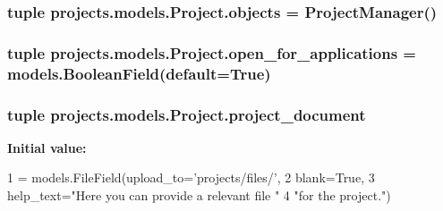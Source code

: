 \hypertarget{classprojects_1_1models_1_1_project_a22a79d939594eb73e56095e8cfb2d314}{
\subsubsection[{objects}]{\setlength{\rightskip}{0pt plus 5cm}tuple projects.\-models.\-Project.\-objects = {\bf Project\-Manager}()\hspace{0.3cm}{\ttfamily [static]}}}\label{classprojects_1_1models_1_1_project_a22a79d939594eb73e56095e8cfb2d314}
\hypertarget{classprojects_1_1models_1_1_project_ad7a6f4cb2b352a988bc7bfd32d99b4fa}{
\subsubsection[{open\-\_\-for\-\_\-applications}]{\setlength{\rightskip}{0pt plus 5cm}tuple projects.\-models.\-Project.\-open\-\_\-for\-\_\-applications = models.\-Boolean\-Field(default=True)\hspace{0.3cm}{\ttfamily [static]}}}\label{classprojects_1_1models_1_1_project_ad7a6f4cb2b352a988bc7bfd32d99b4fa}
\hypertarget{classprojects_1_1models_1_1_project_af3244144358cfcb1060672bb74756a49}{
\subsubsection[{project\-\_\-document}]{\setlength{\rightskip}{0pt plus 5cm}tuple projects.\-models.\-Project.\-project\-\_\-document\hspace{0.3cm}{\ttfamily [static]}}}\label{classprojects_1_1models_1_1_project_af3244144358cfcb1060672bb74756a49}
{\bfseries Initial value\-:}
\begin{DoxyCode}
1 = models.FileField(upload\_to=\textcolor{stringliteral}{'projects/files/'},
2                                         blank=\textcolor{keyword}{True},
3                                         help\_text=\textcolor{stringliteral}{"Here you can provide a relevant file "}
4                                                   \textcolor{stringliteral}{"for the project."})
\end{DoxyCode}
